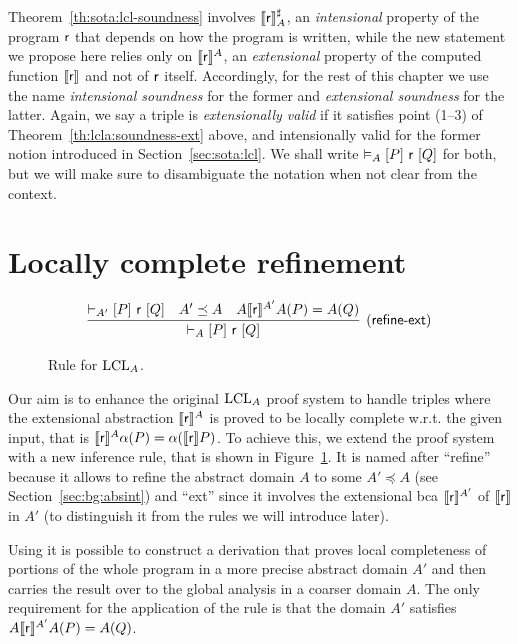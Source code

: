Theorem~\ref{th:sota:lcl-soundness} involves $\llbracket\mathsf{r}\rrbracket^{\sharp}_A$, an \emph{intensional} property of the program $\mathsf{r}$ that depends on how the program is written, while the new statement we propose here relies only on $\llbracket\mathsf{r}\rrbracket^A$, an \emph{extensional} property of the computed function $\llbracket\mathsf{r}\rrbracket$ and not of $\mathsf{r}$ itself.
Accordingly, for the rest of this chapter we use the name \emph{intensional soundness} for the former and \emph{extensional soundness} for the latter.
Again, we say a triple is \emph{extensionally valid} if it satisfies point (1--3) of Theorem~\ref{th:lcla:soundness-ext} above, and intensionally valid for the former notion introduced in Section~\ref{sec:sota:lcl}. We shall write $\vDash_{A}\nobreak[P]~\mathsf{r}~[Q]$ for both, but we will make sure to disambiguate the notation when not clear from the context.

\section{Locally complete refinement}\label{sec:lcla:refinement}
\begin{figure}[t]
	\begin{framed}
		\[
		\infer[\lclrule{refine\mbox{-}ext}]
		{\lcl{A}{P}{\regr}{Q}}
		{\lcl{A'}{P}{\regr}{Q} & A' \preceq A & A \denot{\regr}^{A'} A(P) = A(Q)}
		\]
	\end{framed}
	\vspace{-1ex}
	\caption{Rule  for $\text{LCL}_A$.}\label{fig:lcla:rule-refine}
\end{figure}

Our aim is to enhance the original $\text{LCL}_A$ proof system to handle triples where the extensional abstraction $\llbracket\mathsf{r}\rrbracket^{A}$ is proved to be locally complete w.r.t. the given input, that is $\llbracket\mathsf{r}\rrbracket^{A} \alpha(P) = \alpha(\llbracket\mathsf{r}\rrbracket P)$. To achieve this, we extend the proof system with a new inference rule, that is shown in Figure~\ref{fig:lcla:rule-refine}. It is named after ``refine'' because it allows to refine the abstract domain $A$ to some $A' \preceq A$ (see Section~\ref{sec:bg:absint}) and ``ext'' since it involves the extensional bca $\llbracket\mathsf{r}\rrbracket^{A'}$ of $\llbracket\mathsf{r}\rrbracket$ in $A'$ (to distinguish it from the rules we will introduce later).

Using  it is possible to construct a derivation that proves local completeness of portions of the whole program in a more precise abstract domain $A'$ and then carries the result over to the global analysis in a coarser domain $A$. The only requirement for the application of the rule is that the domain $A'$ satisfies $A \llbracket\mathsf{r}\rrbracket^{A'} A(P) = A(Q)$.


